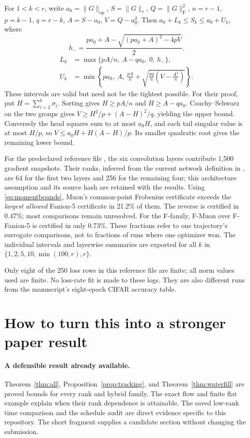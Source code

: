 \documentclass[11pt]{article}
\newcommand{\F}[1]{\lVert #1\rVert_{\mathrm F}}
\newcommand{\nuc}[1]{\lVert #1\rVert_*}
\newcommand{\op}[1]{\lVert #1\rVert_{\mathrm{op}}}
\begin{document}
For $1<k<r$, write $a_0=\op{G}$, $S=\nuc{G}$, $Q=\F{G}^2$,
$n=r-1$, $p=k-1$, $q=r-k$, $A=S-a_0$, $V=Q-a_0^2$.
Then $a_0+L_k\leq S_k\leq a_0+U_k$, where
\[
 h_-=\frac{pa_0+A-\sqrt{(pa_0+A)^2-4pV}}{2}.
\]
\begin{equation}\label{eq:momentbounds}
\begin{aligned}
 L_k&=\max\{pA/n,\ A-qa_0,\ 0,\ h_-\},\\
 U_k&=\min\left\{pa_0,\ A,\
 \frac{pA}{n}+\sqrt{\frac{pq}{n}\left(V-\frac{A^2}{n}\right)}\right\}.
\end{aligned}
\end{equation}
These intervals are valid but need not be the tightest possible.
For their proof, put $H=\sum_{i=2}^k\sigma_i$. Sorting gives
$H\geq pA/n$ and $H\geq A-qa_0$. Cauchy--Schwarz on the two groups gives
$V\geq H^2/p+(A-H)^2/q$, yielding the upper bound. Conversely
the head squares sum to at most $a_0H$, and each tail singular value is at
most $H/p$, so
$V\leq a_0H+H(A-H)/p$. Its smaller quadratic root gives the remaining
lower bound.

For the predeclared reference file
,
the six convolution layers contribute 1,500 gradient snapshots.
Their ranks, inferred from the current network definition in
, are 64 for the first two
layers and 256 for the remaining four; this architecture assumption and its
source hash are retained with the results.
Using \eqref{eq:momentbounds}, Muon's common-point Frobenius certificate
exceeds the \emph{largest allowed} Fanion-5 certificate in 21.2\% of them.
The reverse is certified in 0.47\%; most comparisons remain unresolved.
For the F-family, F-Muon over F-Fanion-5 is certified in only 0.73\%.
These fractions refer to one trajectory's surrogate comparisons, not to
fractions of runs where one optimizer won. The individual intervals and
layerwise summaries are exported for all $k$ in
$\{1,2,5,10,\min(100,r),r\}$.

Only eight of the 250 loss rows in this reference file are finite; all norm
values used are finite. No loss-rate fit is made to these logs. They are
also different runs from the manuscript's eight-epoch CIFAR accuracy table.

\section{How to turn this into a stronger paper result}

\paragraph{A defensible result already available.}
Theorem~\ref{thm:all}, Proposition~\ref{prop:tracking}, and
Theorem~\ref{thm:waterfill} are proved bounds for every rank and hybrid
family. The exact flow and finite flat example explain when their rank
dependence is attainable. The saved low-rank time comparison and the
schedule audit are direct evidence specific to this repository.
The short fragment  supplies a candidate
section without changing the submission.
\end{document}
